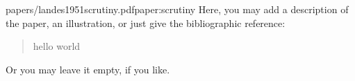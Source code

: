 
\begin{paper}{papers/landes1951scrutiny.pdf}{paper:scrutiny}
    Here, you may add a description of the paper, an illustration, or just give the bibliographic reference:
    \begin{quote}
        hello world
    \end{quote}
    Or you may leave it empty, if you like.
\end{paper}

